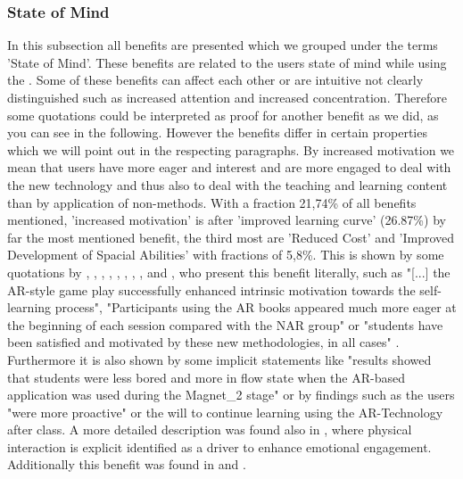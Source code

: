 \subsubsection{State of Mind}
In this subsection all benefits are presented which we grouped under the terms 'State of Mind'. These benefits are related to the users state of mind while using the \AR \appns. Some of these benefits can affect 
each other or are intuitive not clearly distinguished such as increased attention and increased concentration. Therefore some quotations could be interpreted as proof for another benefit as we did, as you can see in the following.
However the benefits differ in certain properties which we will point out in the respecting paragraphs.
By increased motivation we mean that users have more eager and interest and are more engaged to deal with the new technology and thus also to deal with the teaching and learning content than by application of non-\AR methods. With a fraction 21,74\% of all benefits mentioned, 
'increased motivation' is after 'improved learning curve' (26.87\%) by far the most mentioned benefit, the third most are 'Reduced Cost' and 'Improved Development of Spacial Abilities' with fractions of 5,8\%.
This is shown by some quotations by \cite{Dunser.2012}, \cite{Iwata.2011}, \cite{Kamarainen.2013}, \cite{Liu.2009b}, \cite{MartinGutierrez.2011}, \cite{MartinGutierrez.2011}, \cite{Tian.2013}, \cite{Redondo.2013}, 
\cite{VateULan.2012} and \cite{Yen.2013}, who present this benefit literally, such as "[...] the AR-style game play successfully enhanced intrinsic motivation towards the self-learning process"\autocite[113]{Iwata.2011}, "Participants 
using the AR books appeared much more eager at the beginning of each session compared with the NAR group"\autocite[112]{Dunser.2012} or "students have been satisfied and motivated by these new methodologies, in all cases"
\autocite[60]{Redondo.2013}. Furthermore it is also shown by some implicit statements like "results showed that students were less bored and more in flow state
when the AR-based application was used during the Magnet\_2 stage"\autocite[8]{Ibanez.2014} or by findings such as the users "were more proactive"\autocite[10]{Chang.2014}\mulcit\autocite[cf.][187]{Zhang.2014} or the will to continue learning using
the AR-Technology after class\autocite[8]{Liu.2009b}. A more detailed description was found also in \cite{Iwata.2011}, where physical interaction is explicit identified as a driver to enhance emotional
engagement.\autocite[cf.][8]{Iwata.2011} Additionally this benefit was found in \cite{Li.2011} and \cite{Hou.2013}.\autocite[cf.][322]{Li.2011}\mulcit\autocite[cf.][448]{Hou.2013}
